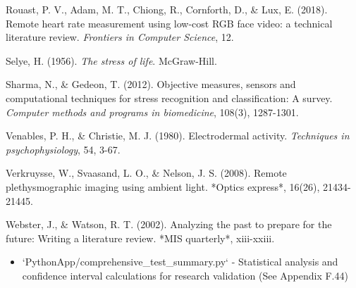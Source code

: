 \documentclass[11pt,a4paper]{article}
\begin{document}
Rouast, P. V., Adam, M. T., Chiong, R., Cornforth, D., \& Lux, E. (2018). Remote heart rate measurement using low-cost
RGB face video: a technical literature review. \textit{Frontiers in Computer Science}, 12.

Selye, H. (1956). \textit{The stress of life}. McGraw-Hill.

Sharma, N., \& Gedeon, T. (2012). Objective measures, sensors and computational techniques for stress recognition and
classification: A survey. \textit{Computer methods and programs in biomedicine}, 108(3), 1287-1301.

Venables, P. H., \& Christie, M. J. (1980). Electrodermal activity. \textit{Techniques in psychophysiology}, 54, 3-67.

Verkruysse, W., Svaasand, L. O., \& Nelson, J. S. (2008). Remote plethysmographic imaging using ambient light. *Optics
express*, 16(26), 21434-21445.

Webster, J., \& Watson, R. T. (2002). Analyzing the past to prepare for the future: Writing a literature review. *MIS
quarterly*, xiii-xxiii.

\begin{itemize}
\item `PythonApp/comprehensive_test_summary.py` - Statistical analysis and confidence interval calculations for research
  validation (See Appendix F.44)
\end{itemize}
\end{document}
